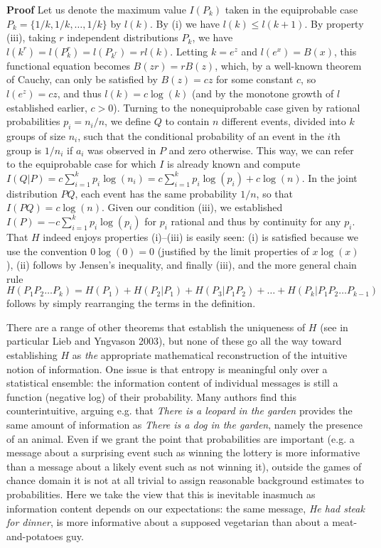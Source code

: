 \smallskip\noindent
{\bf Proof} Let us denote the maximum value $I(P_k)$ taken in the equiprobable
case $P_k=\{1/k,1/k,\ldots,1/k\}$ by $l(k)$.  By (i) we have $l(k) \leq
l(k+1)$. By property (iii), taking $r$ independent distributions $P_k$, we have
$l(k^r)=l(P^r_k)=l(P_{k^r})=rl(k)$. Letting $k=e^z$ and $l(e^x)=B(x)$, this
functional equation becomes $B(zr)=rB(z)$, which, by a well-known theorem of
Cauchy, can only be satisfied by $B(z)=cz$ for some constant $c$, so
$l(e^z)=cz$, and thus $l(k)=c\log(k)$ (and by the monotone growth of $l$
established earlier, $c > 0$). Turning to the nonequiprobable case given by
rational probabilities $p_i=n_i/n$, we define $Q$ to contain $n$ different
events, divided into $k$ groups of size $n_i$, such that the conditional
probability of an event in the $i$th group is $1/n_i$ if $a_i$ was observed 
in $P$ and zero otherwise. This way, we can refer to the equiprobable case for 
which $I$ is already known and compute $I(Q|P)=c\sum_{i=1}^k p_i\log(n_i) =
c\sum_{i=1}^k p_i\log(p_i)+c\log(n)$. In the joint distribution $PQ$, each 
event has the same probability $1/n$, so that $I(PQ) =c\log(n)$. Given our 
condition (iii), we established $I(P)=-c\sum_{i=1}^k p_i\log(p_i)$ for $p_i$
rational and thus by continuity for any $p_i$. That $H$ 
indeed enjoys properties (i)--(iii) is easily seen: (i) is satisfied because 
we use the convention $0\log(0)=0$ (justified by the limit properties of 
$x\log(x)$), (ii) follows by Jensen's inequality, and finally (iii), and 
the more general chain rule $H(P_1P_2\ldots P_k)=H(P_1)+H(P_2|P_1)+
H(P_3|P_1P_2)+\ldots +H(P_k|P_1P_2\ldots P_{k-1})$ follows by simply 
rearranging the terms in the definition.  

\smallskip{} There are a range of other theorems that
establish the uniqueness of $H$ (see in particular Lieb and Yngvason
2003),\nocite{Lieb:2003} but none of these go all the way toward establishing
$H$ as {\it the} appropriate mathematical reconstruction of the intuitive
notion of information. One issue is that entropy is meaningful only over a
statistical ensemble: the information content of individual messages is still
a function (negative log) of their probability. Many authors find this
counterintuitive, arguing e.g. that {\it There is a leopard in the garden}
provides the same amount of information as {\it There is a dog in the garden},
namely the presence of an animal. Even if we grant the point that
probabilities are important (e.g. a message about a surprising event such as
winning the lottery is more informative than a message about a likely event
such as not winning it), outside the games of chance domain it is not at all
trivial to assign reasonable background estimates to probabilities. Here we
take the view that this is inevitable inasmuch as information content depends
on our expectations: the same message, {\it He had steak for dinner}, is more
informative about a supposed vegetarian than about a meat-and-potatoes guy.

